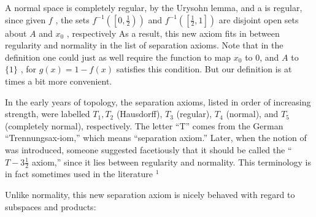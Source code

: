 A normal space is completely regular, by the Urysohn lemma, and a  is regular, since given \(f\) , the sets \({f}^{-1}\left( \left\lbrack  {0,\frac{1}{2}}\right) \right)\) and \({f}^{-1}\left( \left\lbrack  {\frac{1}{2},1}\right\rbrack  \right)\) are disjoint open sets about \(A\) and \({x}_{0}\) , respectively As a result, this new axiom fits in between regularity and normality in the list of separation axioms. Note that in the definition one could just as well require the function to map \({x}_{0}\) to 0, and \(A\) to \(\{ 1\}\) , for \(g\left( x\right)  = 1 - f\left( x\right)\) satisfies this condition. But our definition is at times a bit more convenient.

In the early years of topology, the separation axioms, listed in order of increasing strength, were labelled \({T}_{1},{T}_{2}\) (Hausdorff), \({T}_{3}\) (regular), \({T}_{4}\) (normal), and \({T}_{5}\) (completely normal), respectively. The letter ``T'' comes from the German ``Trennungsax-iom,'' which means ``separation axiom.'' Later, when the notion of  was introduced, someone suggested facetiously that it should be called the `` \(T - 3\frac{1}{2}\) axiom,'' since it lies between regularity and normality. This terminology is in fact sometimes used in the literature \({}^{1}\)

Unlike normality, this new separation axiom is nicely behaved with regard to subspaces and products:

